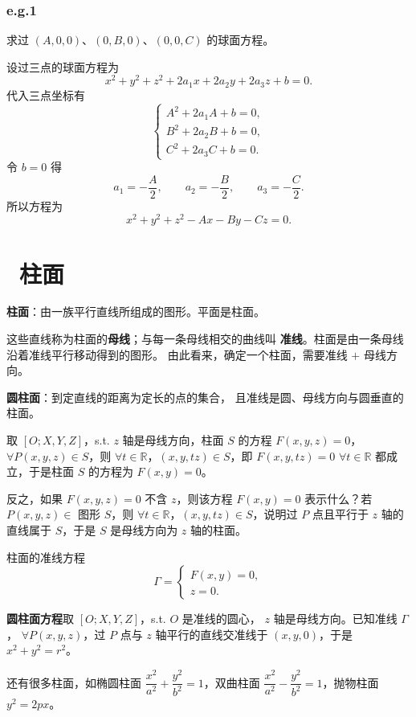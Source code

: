 \documentclass[UTF8,11pt]{ctexart}
\theoremstyle{cnthm}
\begin{document}
\subsubsection*{e.g.1}

求过 $(A,0,0)$、$(0,B,0)$、$(0,0,C)$ 的球面方程。

设过三点的球面方程为
\[
x^2+y^2+z^2+2a_1x+2a_2y+2a_3z+b=0 .
\]
代入三点坐标有
\[
\begin{cases}
A^2+2a_1A+b=0,\\
B^2+2a_2B+b=0,\\
C^2+2a_3C+b=0 .
\end{cases}
\]
令 $b=0$ 得
\[
a_1=-\frac A2,\qquad a_2=-\frac B2,\qquad a_3=-\frac C2 .
\]
所以方程为
\[
x^2+y^2+z^2-Ax-By-Cz=0 .
\]

\section{\ 柱面}

\textbf{柱面}：由一族平行直线所组成的图形。平面是柱面。

这些直线称为柱面的\textbf{母线}；与每一条母线相交的曲线叫
\textbf{准线}。柱面是由一条母线沿着准线平行移动得到的图形。
由此看来，确定一个柱面，需要准线 $+$ 母线方向。

\textbf{圆柱面}：到定直线的距离为定长的点的集合，
且准线是圆、母线方向与圆垂直的柱面。

取 $[O;X,Y,Z]$，s.t. $z$ 轴是母线方向，柱面 $S$ 的方程
$F(x,y,z)=0$，$\forall P(x,y,z)\in S$，则
$\forall t\in\mathbb R$，$(x,y,tz)\in S$，即 $F(x,y,tz)=0$
$\forall t\in\mathbb R$ 都成立，于是柱面 $S$ 的方程为 $F(x,y)=0$。

反之，如果 $F(x,y,z)=0$ 不含 $z$，则该方程 $F(x,y)=0$
表示什么？若 $P(x,y,z)\in$ 图形 $S$，则
$\forall t\in\mathbb R$，$(x,y,tz)\in S$，说明过 $P$ 点且平行于
$z$ 轴的直线属于 $S$，于是 $S$ 是母线方向为 $z$ 轴的柱面。

柱面的准线方程
\[
\Gamma=
\begin{cases}
F(x,y)=0,\\
z=0 .
\end{cases}
\]

\textbf{圆柱面方程}\quad 取 $[O;X,Y,Z]$，s.t. $O$ 是准线的圆心，
$z$ 轴是母线方向。已知准线 $\Gamma$，
$\forall P(x,y,z)$，过 $P$ 点与 $z$ 轴平行的直线交准线于
$(x,y,0)$，于是 $x^2+y^2=r^2$。

还有很多柱面，如椭圆柱面
$\dfrac{x^2}{a^2}+\dfrac{y^2}{b^2}=1$，双曲柱面
$\dfrac{x^2}{a^2}-\dfrac{y^2}{b^2}=1$，抛物柱面 $y^2=2px$。
\end{document}

